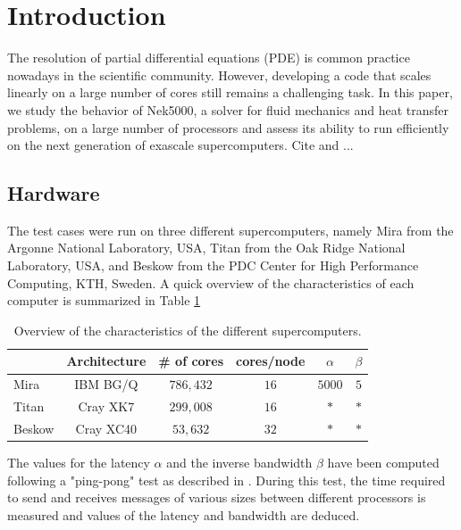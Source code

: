 \documentclass{sig-alternate}
\begin{document}
%
%

%
%
\printccsdesc



\section{Introduction}

The resolution of partial differential equations (PDE) is common practice nowadays in the scientific community. However, developing a code that scales linearly on a large number of cores still remains a challenging task. In this paper, we study the behavior of Nek5000, a solver for fluid mechanics and heat transfer problems, on a large number of processors and assess its ability to run efficiently on the next generation of exascale supercomputers. Cite\cite{fischer:scaling} and \cite{tufo:terascale}...

\subsection{Hardware}

The test cases were run on three different supercomputers, namely Mira from the Argonne National Laboratory, USA, Titan from the Oak Ridge National Laboratory, USA, and Beskow from the PDC Center for High Performance Computing, KTH, Sweden. A quick overview of the characteristics of each computer is summarized in Table \ref{tab:computer_charac}

\begin{table}
\centering
\caption{Overview of the characteristics of the different supercomputers.}
\begin{tabular}{l|ccccc} 
\hline
 & Architecture & \# of cores & cores/node & $\alpha$ & $\beta$\\
 \hline
Mira & IBM BG/Q & $786,432$ & $16$ & $5000$ & $5$\\ 
Titan & Cray XK7 & $299,008$ & $16$ & $*$ & $*$\\ 
Beskow & Cray XC40 & $53,632$ & $32$ & $*$ & $*$\\
\hline
\end{tabular}
\label{tab:computer_charac}
\end{table}

The values for the latency $\alpha$ and the inverse bandwidth $\beta$ have been computed following a "ping-pong" test as described in \cite{fischer:scaling}. During this test, the time required to send and receives messages of various sizes between different processors is measured and values of the latency and bandwidth are deduced.
\end{document}
